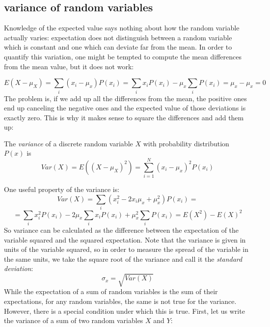 \documentclass[
  letterpaper,
  DIV=11,
  numbers=noendperiod]{scrreprt}
\begin{document}
\hypertarget{variance-of-random-variables}{%
\subsection{variance of random
variables}\label{variance-of-random-variables}}

Knowledge of the expected value says nothing about how the random
variable actually varies: expectation does not distinguish between a
random variable which is constant and one which can deviate far from the
mean. In order to quantify this variation, one might be tempted to
compute the mean differences from the mean value, but it does not work:

\[ E(X-\mu_X) =  \sum_i (x_i-\mu_x)P(x_i) = \sum_i x_i P(x_i) - \mu_x \sum_i P(x_i) = \mu_x - \mu_x = 0\]
The problem is, if we add up all the differences from the mean, the
positive ones end up canceling the negative ones and the expected value
of those deviations is exactly zero. This is why it makes sense to
square the differences and add them up:

\begin{tcolorbox}[enhanced jigsaw, arc=.35mm, colframe=quarto-callout-note-color-frame, left=2mm, opacitybacktitle=0.6, breakable, title=\textcolor{quarto-callout-note-color}{\faInfo}\hspace{0.5em}{Note}, toprule=.15mm, coltitle=black, bottomtitle=1mm, toptitle=1mm, colback=white, leftrule=.75mm, colbacktitle=quarto-callout-note-color!10!white, titlerule=0mm, opacityback=0, rightrule=.15mm, bottomrule=.15mm]

The \emph{variance} of a discrete random variable \(X\) with probability
distribution \(P(x)\) is
\[ Var(X) = E((X-\mu_X)^2) = \sum_{i=1}^N (x_i-\mu_x)^2P(x_i)\]

\end{tcolorbox}

One useful property of the variance is:
\[ Var(X) = \sum_i (x_i^2 - 2x_i\mu_x + \mu_x^2)P(x_i) =\]
\[= \sum_i x_i^2 P(x_i) - 2\mu_x\sum_i x_i P(x_i) + \mu_x^2 \sum_i P(x_i) = E(X^2) - E(X)^2 \]
So variance can be calculated as the difference between the expectation
of the variable squared and the squared expectation. Note that the
variance is given in units of the variable squared, so in order to
measure the spread of the variable in the same units, we take the square
root of the variance and call it the \emph{standard deviation}:
\[\sigma_x = \sqrt{Var(X)}\] While the expectation of a sum of random
variables is the sum of their expectations, for any random variables,
the same is not true for the variance. However, there is a special
condition under which this is true. First, let us write the variance of
a sum of two random variables \(X\) and \(Y\):
\end{document}

